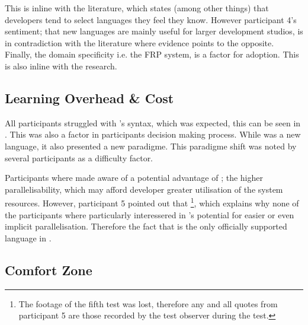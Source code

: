 This is inline with the literature, which states (among other things) that developers tend to select languages they feel they know\cite{meyerovich2013empirical}. However participant 4's sentiment; that new languages are mainly useful for larger development studios, is in contradiction with the literature where evidence points to the opposite. Finally, the domain specificity i.e. the \gls{FRP} system, is a factor for adoption. This is also inline with the research.

\subsection{Learning Overhead \& Cost}
All participants struggled with \fs's syntax, which was expected, this can be seen in . This was also a factor in participants decision making process. While \fs was a new language, it also presented a new paradigme. This paradigme shift was noted by several participants as a difficulty factor.



Participants where made aware of a potential advantage of \fs; the higher parallelisability, which may afford developer greater utilisation of the system resources. However, participant 5 pointed out that \footnote{The footage of the fifth test was lost, therefore any and all quotes from participant 5 are those recorded by the test observer during the test.}, which explains why none of the participants where particularly interessered in \fs's potential for easier or even implicit parallelisation. Therefore the fact that \cs is the only officially supported language in \unity.

\subsection{Comfort Zone}
